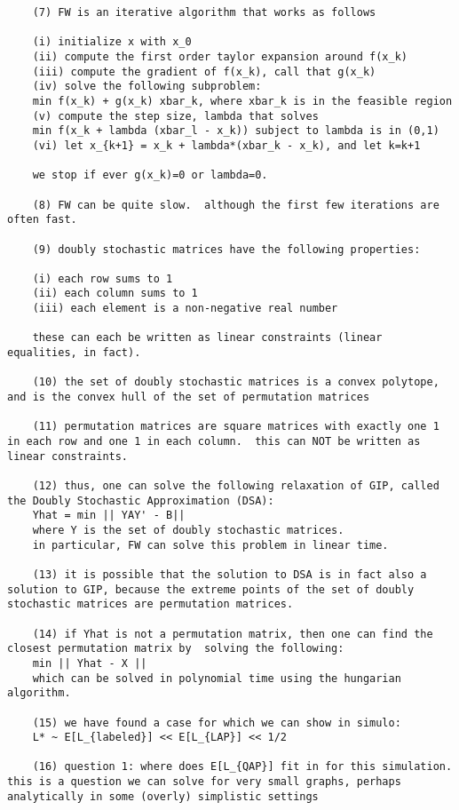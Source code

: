 \begin{verbatim}
	(7) FW is an iterative algorithm that works as follows

	(i) initialize x with x_0
	(ii) compute the first order taylor expansion around f(x_k)
	(iii) compute the gradient of f(x_k), call that g(x_k)
	(iv) solve the following subproblem:
	min f(x_k) + g(x_k) xbar_k, where xbar_k is in the feasible region
	(v) compute the step size, lambda that solves
	min f(x_k + lambda (xbar_l - x_k)) subject to lambda is in (0,1)
	(vi) let x_{k+1} = x_k + lambda*(xbar_k - x_k), and let k=k+1

	we stop if ever g(x_k)=0 or lambda=0.

	(8) FW can be quite slow.  although the first few iterations are often fast.

	(9) doubly stochastic matrices have the following properties:

	(i) each row sums to 1
	(ii) each column sums to 1
	(iii) each element is a non-negative real number

	these can each be written as linear constraints (linear equalities, in fact).

	(10) the set of doubly stochastic matrices is a convex polytope, and is the convex hull of the set of permutation matrices

	(11) permutation matrices are square matrices with exactly one 1 in each row and one 1 in each column.  this can NOT be written as linear constraints.

	(12) thus, one can solve the following relaxation of GIP, called the Doubly Stochastic Approximation (DSA): 
	Yhat = min || YAY' - B||
	where Y is the set of doubly stochastic matrices.
	in particular, FW can solve this problem in linear time.

	(13) it is possible that the solution to DSA is in fact also a solution to GIP, because the extreme points of the set of doubly stochastic matrices are permutation matrices.

	(14) if Yhat is not a permutation matrix, then one can find the closest permutation matrix by  solving the following:
	min || Yhat - X ||
	which can be solved in polynomial time using the hungarian algorithm.  

	(15) we have found a case for which we can show in simulo:
	L* ~ E[L_{labeled}] << E[L_{LAP}] << 1/2

	(16) question 1: where does E[L_{QAP}] fit in for this simulation.  this is a question we can solve for very small graphs, perhaps analytically in some (overly) simplistic settings


\end{verbatim}
